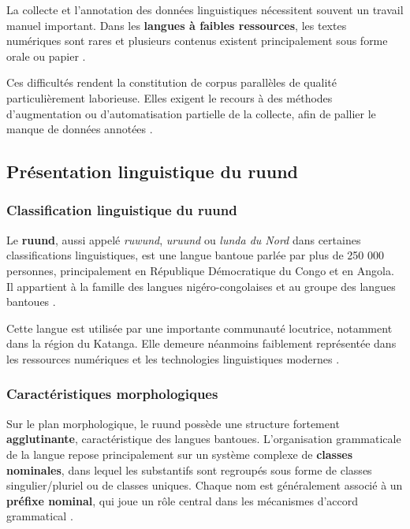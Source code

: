 La collecte et l'annotation des données linguistiques nécessitent souvent un travail manuel important. Dans les \textbf{langues à faibles ressources}, les textes numériques sont rares et plusieurs contenus existent principalement sous forme orale ou papier \cite{agyei2024low, mandiya2026lingala}.

Ces difficultés rendent la constitution de corpus parallèles de qualité particulièrement laborieuse. Elles exigent le recours à des méthodes d'augmentation ou d'automatisation partielle de la collecte, afin de pallier le manque de données annotées \cite{ranathunga2023neural, sharma2023fully}.

\subsection{Présentation linguistique du ruund}

\subsubsection{Classification linguistique du ruund}

Le \textbf{ruund}, aussi appelé \textit{ruwund}, \textit{uruund} ou \textit{lunda du Nord} dans certaines classifications linguistiques, est une langue bantoue parlée par plus de 250 000 personnes, principalement en République Démocratique du Congo et en Angola. Il appartient à la famille des langues nigéro-congolaises et au groupe des langues bantoues \cite{frwiki:199251041}.

Cette langue est utilisée par une importante communauté locutrice, notamment dans la région du Katanga. Elle demeure néanmoins faiblement représentée dans les ressources numériques et les technologies linguistiques modernes \cite{frwiki:199251041}.

\subsubsection{Caractéristiques morphologiques}

Sur le plan morphologique, le ruund possède une structure fortement \textbf{agglutinante}, caractéristique des langues bantoues. L'organisation grammaticale de la langue repose principalement sur un système complexe de \textbf{classes nominales}, dans lequel les substantifs sont regroupés sous forme de classes singulier/pluriel ou de classes uniques. Chaque nom est généralement associé à un \textbf{préfixe nominal}, qui joue un rôle central dans les mécanismes d'accord grammatical \cite{kawasha2003lunda}.


